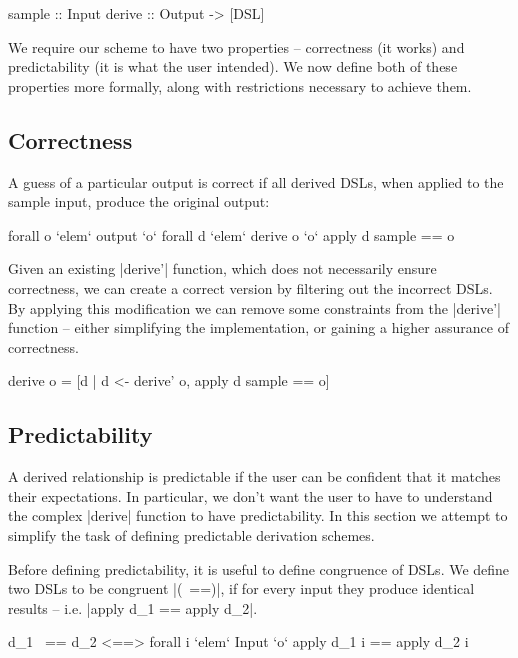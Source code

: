 \documentclass[preprint,draft]{sigplanconf}
\begin{document}
\begin{code}
sample  :: Input
derive  :: Output -> [DSL]
\end{code}

We require our scheme to have two properties -- correctness (it works) and predictability (it is what the user intended). We now define both of these properties more formally, along with restrictions necessary to achieve them.

\subsection{Correctness}
\label{sec:correctness}

A guess of a particular output is correct if all derived DSLs, when applied to the sample input, produce the original output:

\ignore\begin{code}
forall o `elem` output `o` forall d `elem` derive o `o` apply d sample == o
\end{code}

Given an existing |derive'| function, which does not necessarily ensure correctness, we can create a correct version by filtering out the incorrect DSLs. By applying this modification we can remove some constraints from the |derive'| function -- either simplifying the implementation, or gaining a higher assurance of correctness.

\begin{code}
derive o = [d | d <- derive' o, apply d sample == o]
\end{code}

\subsection{Predictability}

A derived relationship is predictable if the user can be confident that it matches their expectations. In particular, we don't want the user to have to understand the complex |derive| function to have predictability. In this section we attempt to simplify the task of defining predictable derivation schemes.

Before defining predictability, it is useful to define congruence of DSLs. We define two DSLs to be congruent |(~==)|, if for every input they produce identical results -- i.e. |apply d_1 == apply d_2|.

\ignore\begin{code}
d_1 ~== d_2 <==> forall i `elem` Input `o` apply d_1 i == apply d_2 i
\end{code}
\end{document}
